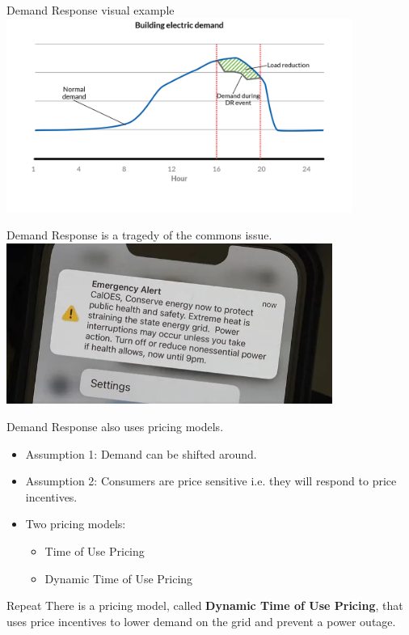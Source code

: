 \documentclass{beamer}
\begin{document}
\begin{frame}{Demand Response visual example}
  \centering
  \includegraphics[width=0.85\textwidth]{images/demand-response.png}
\end{frame}

\begin{frame}{Demand Response is a tragedy of the commons issue.}
  \centering
  \includegraphics[width=0.8\textwidth]{images/OES-power-text.png}
\end{frame}

\begin{frame}{Demand Response also uses pricing models.}
  \begin{itemize}
    \item<+-> Assumption 1: Demand can be shifted around.
    \item<+-> Assumption 2: Consumers are price sensitive i.e. they will respond to price incentives.
    \item<+-> Two pricing models:
    \begin{itemize}
      \item<+-> Time of Use Pricing
      \item<+-> Dynamic Time of Use Pricing
    \end{itemize}
  \end{itemize}
\end{frame}

\begin{frame}{Repeat}
  There is a pricing model, called \textbf{Dynamic Time of Use Pricing}, that uses price incentives to lower demand on the grid and prevent a power outage.
\end{frame}
\end{document}
